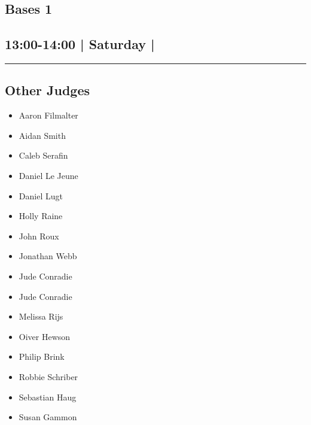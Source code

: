 \documentclass[10pt, A5]{article}
\begin{document}
		\begin{framed}
			\begin{minipage}{\textwidth}

			\setcounter{section}{27}
							\section{Bases 1}
						
			\subsection*{13:00-14:00 | Saturday | }

			\vspace{0.25cm}
			\hrule
			\vspace{0.25cm}


			\subsection*{Other Judges}
							

				\begin{multicols}{2}

			\begin{itemize}
											\item Aaron Filmalter
											\item Aidan Smith
											\item Caleb Serafin
											\item Daniel Le Jeune
											\item Daniel Lugt
											\item Holly Raine
											\item John Roux
											\item Jonathan Webb
											\item Jude Conradie
								\end{itemize}

			\vfill\null
			\columnbreak

			\begin{itemize}
											\item Jude Conradie
											\item Melissa Rijs
											\item Oiver Hewson
											\item Philip Brink
											\item Robbie Schriber
											\item Sebastian Haug
											\item Susan Gammon
								\end{itemize}


\end{multicols}
\end{minipage}
\end{framed}
\end{document}
